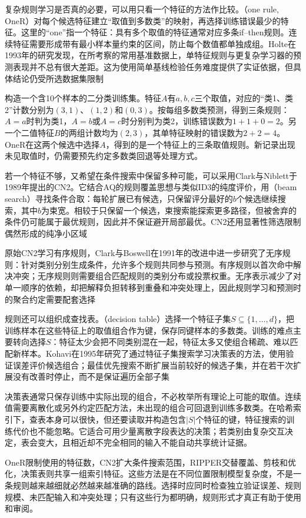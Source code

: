 复杂规则学习是否真的必要，可以用只看一个特征的方法作比较。（one rule, OneR）对每个候选特征建立“取值到多数类”的映射，再选择训练错误最少的特征。这里的“one”指一个特征：具有多个取值的特征通常对应多条if--then规则。连续特征需要形成带有最小样本量约束的区间，防止每个数值都单独成组。Holte在1993年的研究发现，在所考察的常用基准数据上，单特征规则与更复杂学习器的预测表现并不总有很大差距。这为使用简单基线检验任务难度提供了实证依据，但具体结论仍受所选数据集限制

\begin{example}[一个特征可以产生多条规则]
  \label{ex:classification-oner}
  构造一个含10个样本的二分类训练集。特征$A$有$a,b,c$三个取值，对应的“类1、类2”计数分别为$(3,1)$、$(1,2)$和$(0,3)$。按每组多数类预测，得到三条规则：$A=a$时判为类1，$A=b$或$A=c$时分别判为类2，训练错误数为$1+1+0=2$。另一个二值特征$B$的两组计数均为$(2,3)$，其单特征映射的错误数为$2+2=4$。OneR在这两个候选中选择$A$，得到的是一个特征上的三条取值规则。新记录出现未见取值时，仍需要预先约定多数类回退等处理方式。
\end{example}

若一个特征不够，又希望在条件搜索中保留多种可能，可以采用Clark与Niblett于1989年提出的CN2。它结合AQ的规则覆盖思想与类似ID3的纯度评价，用（beam search）寻找条件合取：每轮扩展已有候选，只保留评分最好的$b$个候选继续搜索，其中$b$为束宽。相较于只保留一个候选，束搜索能探索更多路径，但被舍弃的条件仍可能属于最优规则，因此并不保证避开局部最优。CN2还用显著性筛选限制偶然形成的纯净小区域

原始CN2学习有序规则，Clark与Boswell在1991年的改进中进一步研究了无序规则：针对类别分别生成条件，允许多个规则共同参与预测。有序规则以首次命中解决冲突；无序规则则需要组合匹配规则的类别分布或投票权重。无序表示减少了对单一顺序的依赖，却把解释负担转移到重叠和冲突处理上，因此规则学习和预测时的聚合约定需要配套选择

规则还可以组织成查找表。（decision table）选择一个特征子集$S\subseteq\{1,\ldots,d\}$，把训练样本在这些特征上的取值组合作为键，保存同键样本的多数类。训练的难点主要转向选择$S$：特征太少会把不同类别混在一起，特征太多又使组合稀疏、难以匹配新样本。Kohavi在1995年研究了通过特征子集搜索学习决策表的方法，使用验证误差评价候选组合；最佳优先搜索不断扩展当前较好的候选子集，并在若干次扩展没有改善时停止，而不是保证遍历全部子集

决策表通常只保存训练中实际出现的组合，不必枚举所有理论上可能的取值。连续值需要离散化或另外约定匹配方法，未出现的组合可回退到训练多数类。在哈希索引下，查表本身可以很快，但还要读取并构造包含$|S|$个特征的键，特征搜索的训练代价也不能忽略。它适合可用少量离散字段表达的决策；若类别由复杂交互决定，表会变大，且相近却不完全相同的输入不能自动共享统计证据。

OneR限制使用的特征数，CN2扩大条件搜索范围，RIPPER交替覆盖、剪枝和优化，决策表则共享一组索引特征。这些方法是在不同位置限制模型复杂度，不是一条规则越来越细就必然越来越准确的路线。选择时应同时检查独立验证误差、规则规模、未匹配输入和冲突处理；只有这些行为都明确，规则形式才真正有助于使用和审阅。
